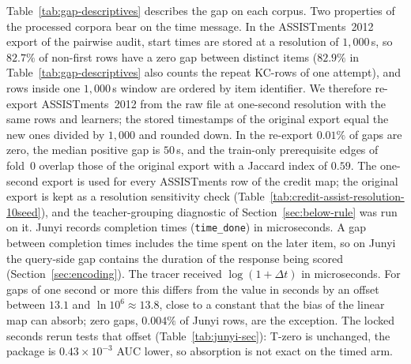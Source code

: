 \documentclass[review,12pt]{elsarticle}
\begin{document}
Table~\ref{tab:gap-descriptives} describes the gap on each corpus. Two
properties of the processed corpora bear on the time message. In the
ASSISTments~2012 export of the pairwise audit, start times are stored
at a resolution of $1{,}000$\,s, so $82.7\%$ of non-first rows have a
zero gap between distinct items ($82.9\%$ in
Table~\ref{tab:gap-descriptives} also counts the repeat KC-rows of one
attempt), and rows inside one $1{,}000$\,s window are ordered by item
identifier. We therefore re-export ASSISTments~2012 from the raw
file at one-second resolution with the same rows and learners; the
stored timestamps of the original export equal the new ones divided by
$1{,}000$ and rounded down. In the re-export $0.01\%$ of gaps are
zero, the median positive gap is $50$\,s, and the train-only
prerequisite edges of fold~0 overlap those of the original export with
a Jaccard index of $0.59$. The one-second export is used for every
ASSISTments row of the credit map; the original export is kept as a
resolution sensitivity check (Table~\ref{tab:credit-assist-resolution-10seed}),
and the teacher-grouping diagnostic of Section~\ref{sec:below-rule} was
run on it. Junyi records completion times (\texttt{time\_done}) in
microseconds. A gap between completion times includes the time spent
on the later item, so on Junyi the query-side gap contains the duration
of the response being scored (Section~\ref{sec:encoding}). The
tracer received $\log(1{+}\Delta t)$ in microseconds. For gaps of one
second or more this differs from the value in seconds by an offset
between $13.1$ and $\ln 10^{6}\approx 13.8$, close to a constant that
the bias of the linear map can absorb; zero gaps, $0.004\%$ of Junyi
rows, are the exception. The locked seconds rerun tests that offset
(Table~\ref{tab:junyi-sec}): T-zero is unchanged, the package is
$0.43\times 10^{-3}$ AUC lower, so absorption is not exact on the
timed arm.



\end{document}
